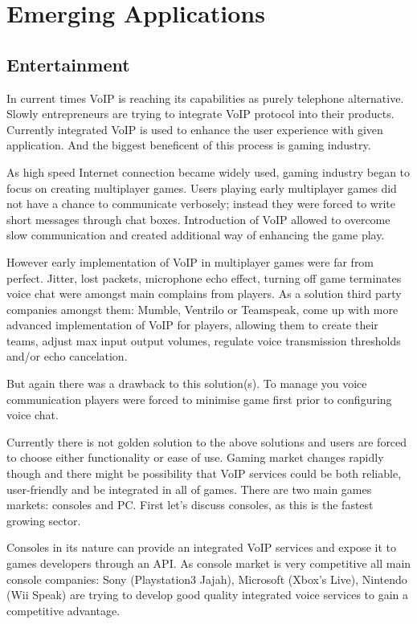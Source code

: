 
\section{Emerging  Applications}

\subsection{Entertainment}

In current times VoIP is reaching its capabilities as purely telephone alternative. Slowly entrepreneurs are trying to integrate VoIP protocol into their products. Currently integrated VoIP is used to enhance the user experience with given application. And the biggest beneficent of this process is gaming industry. 

As high speed Internet connection became widely used, gaming industry began to focus on creating multiplayer games. Users playing early multiplayer games did not have a chance to communicate verbosely; instead they were forced to write short messages through chat boxes. Introduction of VoIP allowed to overcome slow communication and created additional way of enhancing the game play\cite{website:voip_impact_on_gaming}.


However early implementation of VoIP in multiplayer games were far from perfect. Jitter, lost packets, microphone echo effect, turning off game terminates voice chat were amongst main complains from players. As a solution third party companies  amongst them: Mumble, Ventrilo or Teamspeak, come up with more advanced implementation of VoIP for players, allowing them to create their teams, adjust max input output volumes, regulate voice transmission thresholds and/or echo cancelation\cite{website:mumble_faq}. 

But again there was a drawback to this solution(s). To manage you voice communication players were forced to minimise game first prior to configuring voice chat.

Currently there is not golden solution to the above solutions and users are forced to choose either functionality or ease of use.
Gaming market changes rapidly though and there might be possibility that VoIP services could be both reliable, user-friendly and be integrated in all of games. There are two main games markets: consoles and PC. First let's discuss consoles, as this is the fastest growing sector\cite{website:shift_in_gaming_demographics}.

Consoles in its nature can provide an integrated VoIP services and expose it to games developers through an API. As console market is very competitive all main console companies: Sony (Playstation3 Jajah\cite{website:playstation3_voip_figures}), Microsoft (Xbox's Live)\cite{website:xbox_figures}, Nintendo (Wii Speak)\cite{website:wii_voip} are trying to develop good quality integrated voice services to gain a competitive advantage\cite{website:voip_adataion}.

